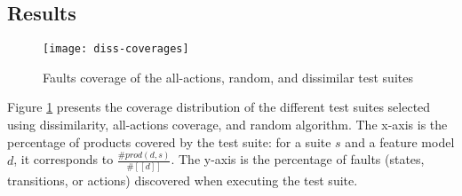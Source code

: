 \subsection{Results}

\begin{figure}
	\centering
	\texttt{[image: diss-coverages]}
	\caption{Faults coverage of the all-actions, random, and dissimilar test suites}
	\label{fig:assessment:faultscoverage}
\end{figure}

Figure \ref{fig:assessment:faultscoverage} presents the coverage distribution of the different test suites selected using dissimilarity, all-actions coverage, and random algorithm. The x-axis is the percentage of products covered by the test suite: for a suite $s$ and a feature model $d$, it corresponds to $\frac{\#prod(d, s)}{\# [\![d]\!]}$. The y-axis is the percentage of faults (states, transitions, or actions) discovered when executing the test suite.


